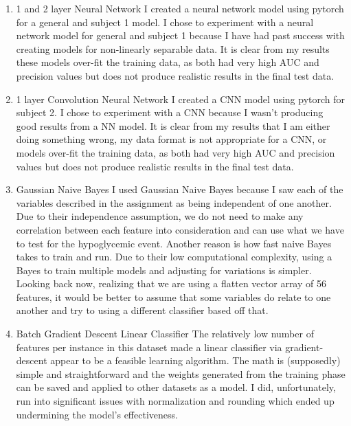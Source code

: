 \documentclass[11pt,a4paper]{article}
\begin{document}
\begin{enumerate}
	\item 1 and 2 layer Neural Network
		\subitem
		I created a neural network model using pytorch for a general and subject 1 model.
		I chose to experiment with a neural network model for general and subject 1 because I have had past success with creating models for non-linearly separable data.
		It is clear from my results these models over-fit the training data, as both had very high AUC and precision values but does not produce realistic results in the final test data.

	\item 1 layer Convolution Neural Network
		\subitem
		I created a CNN model using pytorch for subject 2.
		I chose to experiment with a CNN because I wasn't producing good results from a NN model.
		It is clear from my results that I am either doing something wrong, my data format is not appropriate for a CNN, or models over-fit the training data, as both had very high AUC and precision values but does not produce realistic results in the final test data.
		
	\item Gaussian Naive Bayes
	    \subitem
	    I used Gaussian Naive Bayes because I saw each of the variables described in the assignment as being independent of one another.
	    Due to their independence assumption, we do not need to make any correlation between each feature into consideration and can use what we have to test for the hypoglycemic event.
	    Another reason is how fast naive Bayes takes to train and run.
	    Due to their low computational complexity, using a Bayes to train multiple models and adjusting for variations is simpler.
	    Looking back now, realizing that we are using a flatten vector array of 56 features, it would be better to assume that some variables do relate to one another and try to using a different classifier based off that.
	    
	 \item Batch Gradient Descent Linear Classifier
	    \subitem
	    The relatively low number of features per instance in this dataset made a linear classifier via gradient-descent appear to be a feasible learning algorithm. The math is (supposedly) simple and straightforward and the weights generated from the training phase can be saved and applied to other datasets as a model. I did, unfortunately, run into significant issues with normalization and rounding which ended up undermining the model's effectiveness.
\end{enumerate}
\end{document}

